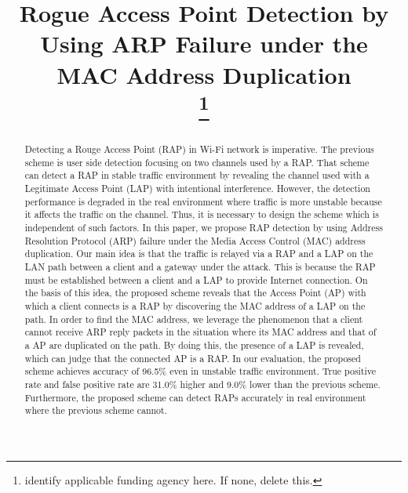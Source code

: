 \documentclass[conference]{IEEEtran}
\begin{document}
\title{Rogue Access Point Detection by Using ARP Failure under the MAC Address Duplication\\
\thanks{identify applicable funding agency here. If none, delete this.}
}

\author{

}
\maketitle
\begin{abstract}
Detecting a Rouge Access Point (RAP) in Wi-Fi network is imperative.
The previous scheme is user side detection focusing on two channels used by a RAP.
That scheme can detect a RAP in stable traffic environment by revealing the channel used with a Legitimate Access Point (LAP) with intentional interference.
However, the detection performance is degraded in the real environment where traffic is more unstable because it affects the traffic on the channel.
Thus, it is necessary to design the scheme which is independent of such factors.
In this paper, we propose RAP detection by using Address Resolution Protocol (ARP) failure under the Media Access Control (MAC) address duplication.
Our main idea is that the traffic is relayed via a RAP and a LAP on the LAN path between a client and a gateway under the attack.
This is because the RAP must be established between a client and a LAP to provide Internet connection.
    On the basis of this idea, the proposed scheme reveals that the Access Point (AP) with which a client connects is a RAP by discovering the MAC address of a LAP on the path.
In order to find the MAC address, we leverage the phenomenon that a client cannot receive ARP reply packets in the situation where its MAC address and that of a AP are duplicated on the path.
By doing this, the presence of a LAP is revealed, which can judge that the connected AP is a RAP.
In our evaluation, the proposed scheme achieves accuracy of 96.5\% even in unstable traffic environment.
True positive rate and false positive rate are 31.0\% higher and 9.0\% lower than the previous scheme.
Furthermore, the proposed scheme can detect RAPs accurately in real environment where the previous scheme cannot.
\end{abstract}
\end{document}
